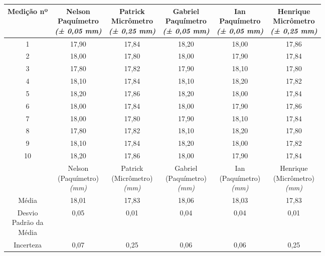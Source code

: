\documentclass{article}
\begin{document}
\begin{table}[h!]
\centering
\begin{tabular}{c c c c c c }
\toprule
Medição nº & \shortstack{Nelson\\Paquímetro\\\textit{(± 0,05 mm)}} & \shortstack{Patrick\\Micrômetro\\\textit{(± 0,25 mm)}} & \shortstack{Gabriel\\Paquímetro\\\textit{(± 0,05 mm)}} & \shortstack{Ian\\Paquímetro\\\textit{(± 0,05 mm)}} & \shortstack{Henrique\\Micrômetro\\\textit{(± 0,25 mm)}}\\
\midrule
1 & 17,90 & 17,84 & 18,20 & 18,00 & 17,86\\
2 & 18,00 & 17,80 & 18,00 & 17,90 & 17,84\\
3 & 17,80 & 17,82 & 17,90 & 18,10 & 17,80\\
4 & 18,10 & 17,84 & 18,10 & 18,20 & 17,82\\
5 & 18,20 & 17,86 & 18,20 & 18,00 & 17,84\\
6 & 18,00 & 17,84 & 18,00 & 17,90 & 17,86\\
7 & 18,00 & 17,80 & 17,90 & 18,10 & 17,84\\
8 & 17,80 & 17,82 & 18,10 & 18,20 & 17,80\\
9 & 18,10 & 17,84 & 18,20 & 18,00 & 17,82\\
10 & 18,20 & 17,86 & 18,00 & 17,90 & 17,84\\
\midrule
&\shortstack{Nelson\\(Paquímetro)\\\textit{(mm)}} & \shortstack{Patrick\\(Micrômetro)\\\textit{(mm)}} & \shortstack{Gabriel\\(Paquímetro)\\\textit{(mm)}} & \shortstack{Ian\\(Paquímetro)\\\textit{(mm)}} & \shortstack{Henrique\\(Micrômetro)\\\textit{(mm)}}\\
\midrule
Média & 18,01 & 17,83 & 18,06 & 18,03 & 17,83\\[3pt]
\shortstack{Desvio\\Padrão da\\Média} & 0,05 & 0,01 & 0,04 & 0,04 & 0,01\\[3pt]
Incerteza & 0,07 & 0,25 & 0,06 & 0,06 & 0,25\\
\bottomrule
\end{tabular}
\end{table}
\end{document}
